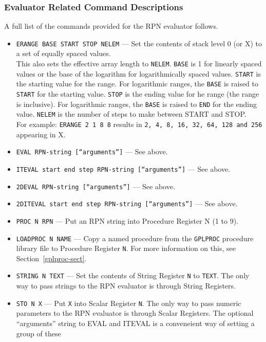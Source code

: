 \documentclass[a4paper,twoside,11pt]{article}
\newcommand{\textttc}[1]{\texttt{\textcolor{OurRed}{#1}}}
\begin{document}
\subsubsection{Evaluator Related Command Descriptions}
A full list of the commands provided for the RPN evaluator follows.
\begin{itemize}
\item \textttc{ERANGE BASE START STOP NELEM} --- Set the contents of stack level 0 (or X) to a set of equally spaced values.\\
  This also sets the effective array length to \texttt{NELEM}.
  \texttt{BASE} is 1 for linearly spaced values or the base of the logarithm for logarithmically spaced values.
  \texttt{START} is the starting value for the range.
  For logarithmic ranges, the \texttt{BASE} is raised to \texttt{START} for the starting value.
  \texttt{STOP} is the ending value for he range (the range is inclusive).
  For logarithmic ranges, the \texttt{BASE} is raised to \texttt{END} for the ending value.
  \texttt{NELEM} is the number of steps to make between START and STOP.\\
  For example: \texttt{ERANGE 2 1 8 8} results in \texttt{2, 4, 8, 16, 32, 64, 128 and 256} appearing in X.
\item \textttc{EVAL RPN-string [``arguments'']} --- See above.
\item \textttc{ITEVAL start end step RPN-string [``arguments'']} --- See above.
\item \textttc{2DEVAL RPN-string [``arguments'']} --- See above.
\item \textttc{2DITEVAL start end step RPN-string [``arguments'']} --- See above.  
\item \textttc{PROC N RPN} --- Put an RPN string into Procedure Register N (1 to 9).
\item \textttc{LOADPROC N NAME} --- Copy a named procedure from the \texttt{GPLPROC} procedure library file to Procedure Register \texttt{N}.
  For more information on this, see Section~\ref{gplproc-sect}.
\item \textttc{STRING N TEXT} --- Set the contents of String Register \texttt{N} to \texttt{TEXT}.
  The only way to pass strings to the RPN evaluator is through String Registers.
\item \textttc{STO N X} --- Put \texttt{X} into Scalar Register \texttt{N}. The only way to pass numeric parameters to the RPN evaluator is through
  Scalar Registers. The optional ``arguments'' string to EVAL and ITEVAL is a conveneient way of setting a group of these

\end{itemize}
\end{document}
